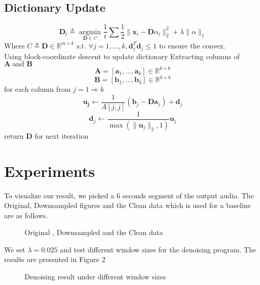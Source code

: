\documentclass[UTF8]{article}
\begin{document}
\subsection{Dictionary Update}
\[\bm{D}_t \triangleq \mathop{\arg\min}\limits_{\bm{D} \in C} \frac{1}{t} \sum{ \frac{1}{2} \| \bm{x}_i - \bm{D} \alpha_i  \|^2_2 + \lambda \|\alpha\|_1}
\]
Where $C \triangleq {\bm{D} \in \mathbb{R}^{m \times k} \text{ s.t. } \forall j = 1, ..., k, \bm{d}_j^T\bm{d}_j \leq 1}$ to ensure the convex.
\\
Using block-coordinate descent to update dictionary
Extracting columns of $\bm{A} \text{ and } \bm{B}$
\[\bm{A} = [\bm{a}_1, ..., \bm{a}_k] \in \mathbb{R}^{k \times k}\]
\[\bm{B} = [\bm{b}_1, ..., \bm{b}_k] \in \mathbb{R}^{k \times k}\]
for each column from $j = 1 \Rightarrow k$
\[\bm{u_j} \leftarrow \frac{1}{A[j, j]}(\bm{b}_j - \bm{Da}_j) + \bm{d}_j\]
\[\bm{d}_j \leftarrow \frac{1}{\max(\|\bm{u}_j\|_2, 1)}\bm{u}_j\]
return $\bm{D}$ for next iteration


\section{Experiments}

To visualize our result, we picked a 6 seconds segment of the output audio.
The Original, Downsampled figures and the Clean data which is used for a baseline are as follows.


\begin{figure}[H]
    \centering
    \caption{Original , Downsampled and the Clean data}
\end{figure}


We set $\lambda = 0.025$ and test different window sizes for the denoising program. The results are presented in Figure 2


\begin{figure}[H]
    \centering
    \caption{Denoising result under different window sizes}
\end{figure}
\end{document}
